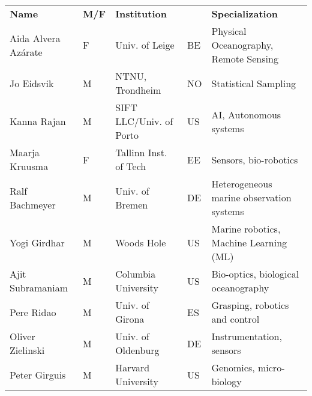 \clearpage
\begin{table}[H]
  \footnotesize{
\begin{tabular}{|p{3.5cm}|p{0.7cm}|p{4.0cm}|p{0.5cm}|p{6.0cm}|}
  \rowcolor{Gray}
  \bfseries Name& \bfseries M/F&\bfseries Institution & & \bfseries Specialization\\
  Aida Alvera Az\'{a}rate    & F   & Univ. of Leige                        & BE       &Physical Oceanography, Remote Sensing\\
  \hline
  Jo Eidsvik               & M   & NTNU, Trondheim                                  & NO       & Statistical Sampling                            \\
  \hline
  Kanna Rajan              & M   & SIFT LLC/Univ. of Porto            & US       & AI, Autonomous systems           \\
  \hline
  Maarja Kruusma  & F   & Tallinn Inst. of Tech
                                                      & EE  & Sensors,
                                                              bio-robotics                                \\
  \hline
  Ralf Bachmeyer           & M   & Univ. of Bremen                       & DE       & Heterogeneous marine observation systems                        \\
  \hline
  Yogi Girdhar             & M   & Woods Hole
                                                      & US       &
                                                                   Marine
                                                                   robotics,
                                                                   Machine
                                                                   Learning
  (ML)\\
  \hline
  Ajit Subramaniam         & M   & Columbia University
                                                      & US       &
                                                                   Bio-optics, biological oceanography                        \\
  \hline
  Pere Ridao               & M   & Univ. of Girona& ES       & Grasping, robotics and control                            \\
  \hline
  Oliver Zielinski          & M   & Univ. of Oldenburg                   & DE       & Instrumentation, sensors                        \\
  \hline
  Peter Girguis            & M   & Harvard University                               & US       & Genomics, micro-biology                         \\

\end{tabular}}
\end{table}
